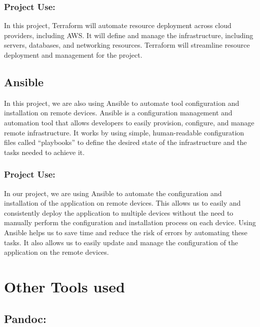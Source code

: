 \documentclass[
  10pt,
  paper=a4,
  ,captions=tableheading
]{scrartcl}
\begin{document}
\hypertarget{project-use-6}{%
\subsubsection{Project Use:}\label{project-use-6}}

In this project, Terraform will automate resource deployment across
cloud providers, including AWS. It will define and manage the
infrastructure, including servers, databases, and networking resources.
Terraform will streamline resource deployment and management for the
project.

\hypertarget{ansible}{%
\subsection{Ansible}\label{ansible}}

In this project, we are also using Ansible to automate tool
configuration and installation on remote devices. Ansible is a
configuration management and automation tool that allows developers to
easily provision, configure, and manage remote infrastructure. It works
by using simple, human-readable configuration files called ``playbooks''
to define the desired state of the infrastructure and the tasks needed
to achieve it.

\hypertarget{project-use-7}{%
\subsubsection{Project Use:}\label{project-use-7}}

In our project, we are using Ansible to automate the configuration and
installation of the application on remote devices. This allows us to
easily and consistently deploy the application to multiple devices
without the need to manually perform the configuration and installation
process on each device. Using Ansible helps us to save time and reduce
the risk of errors by automating these tasks. It also allows us to
easily update and manage the configuration of the application on the
remote devices.

\hypertarget{other-tools-used}{%
\section{Other Tools used}\label{other-tools-used}}

\hypertarget{pandoc}{%
\subsection{Pandoc:}\label{pandoc}}
\end{document}
